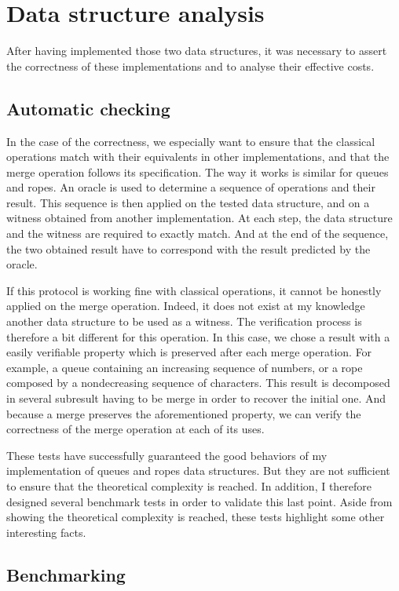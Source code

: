 \documentclass{article}
\begin{document}
\section{Data structure analysis}

After having implemented those two data structures, it was necessary to assert the correctness of these implementations and to analyse their effective costs.

\subsection{Automatic checking}

In the case of the correctness, we especially want to ensure that the classical operations match with their equivalents in other implementations, and that the merge operation follows its specification.
The way it works is similar for queues and ropes.
An oracle is used to determine a sequence of operations and their result.
This sequence is then applied on the tested data structure, and on a witness obtained from another implementation.
At each step, the data structure and the witness are required to exactly match.
And at the end of the sequence, the two obtained result have to correspond with the result predicted by the oracle.

If this protocol is working fine with classical operations, it cannot be honestly applied on the merge operation.
Indeed, it does not exist at my knowledge another data structure to be used as a witness.
The verification process is therefore a bit different for this operation.
In this case, we chose a result with a easily verifiable property which is preserved after each merge operation.
For example, a queue containing an increasing sequence of numbers, or a rope composed by a nondecreasing sequence of characters.
This result is decomposed in several subresult having to be merge in order to recover the initial one.
And because a merge preserves the aforementioned property, we can verify the correctness of the merge operation at each of its uses.

These tests have successfully guaranteed the good behaviors of my implementation of queues and ropes data structures.
But they are not sufficient to ensure that the theoretical complexity is reached.
In addition, I therefore designed several benchmark tests in order to validate this last point.
Aside from showing the theoretical complexity is reached, these tests highlight some other interesting facts.


\subsection{Benchmarking}
\end{document}
